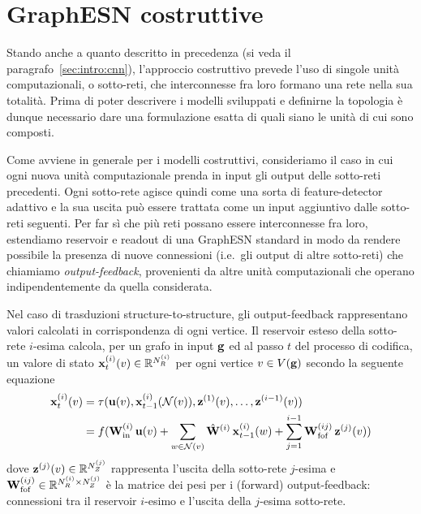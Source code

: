 \section{GraphESN costruttive}\label{sec:modelli:constr}
Stando anche a quanto descritto in precedenza (si veda il paragrafo~\vref{sec:intro:cnn}), l'approccio costruttivo prevede l'uso di singole unità computazionali, o sotto-reti, che interconnesse fra loro formano una rete nella sua totalità. Prima di poter descrivere i modelli sviluppati e definirne la topologia è dunque necessario dare una formulazione esatta di quali siano le unità di cui sono composti.

Come avviene in generale per i modelli costruttivi, consideriamo il caso in cui ogni nuova unità computazionale prenda in input gli output delle sotto-reti precedenti. Ogni sotto-rete agisce quindi come una sorta di feature-detector adattivo e la sua uscita può essere trattata come un input aggiuntivo dalle sotto-reti seguenti. Per far sì che più reti possano essere interconnesse fra loro, estendiamo reservoir e readout di una GraphESN standard in modo da rendere possibile la presenza di nuove connessioni (i.e.\ gli output di altre sotto-reti) che chiamiamo \emph{output-feedback}, provenienti da altre unità computazionali che operano indipendentemente da quella considerata.

Nel caso di trasduzioni structure-to-structure, gli output-feedback rappresentano valori calcolati in corrispondenza di ogni vertice. Il reservoir esteso della sotto-rete $i$-esima calcola, per un grafo in input $\mathbf{g}$ ed al passo $t$ del processo di codifica, un valore di stato $\mathbf{x}^{(i)}_t(v) \in \mathbb{R}^{N^{(i)}_R}$ per ogni vertice $v \in V(\mathbf{g})$ secondo la seguente equazione
\begin{equation}\label{eq:constructiveGESN:str2str}
\begin{split}	
\vect{x}^{(i)}_t(v)
	&= \tau( \vect{u}(v), \vect{x}^{(i)}_{t-1}(\mathcal{N}(v)), \vect{z}^{(1)}(v), \dots, \vect{z}^{(i-1)}(v) ) \\
	&= f( 
	\matr{W}^{(i)}_\textup{in} \, \vect{u}(v) + 
	\sum_{w \in \mathcal{N}(v)} \hat{\matr{W}}^{(i)} \, \vect{x}^{(i)}_{t-1}(w) +
	\sum_{j=1}^{i-1} \matr{W}^{(ij)}_\textup{fof} \, \vect{z}^{(j)}(v)
	)
\end{split}
\end{equation}
dove $\mathbf{z}^{(j)}(v) \in \mathbb{R}^{N^{(j)}_Z}$ rappresenta l'uscita della sotto-rete $j$-esima e $\matr{W}^{(ij)}_\textup{fof} \in \R^{N^{(i)}_R \times N^{(j)}_Z}$ è la matrice dei pesi per i (forward) output-feedback: connessioni tra il reservoir $i$-esimo e l'uscita della $j$-esima sotto-rete.

